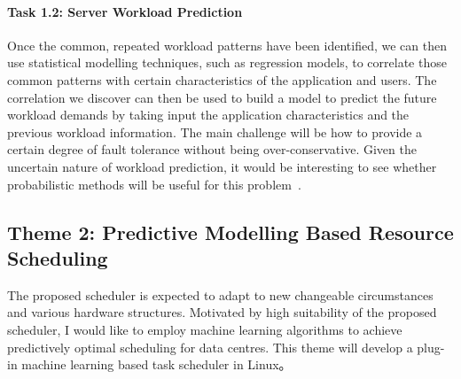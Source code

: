 \paragraph{Task 1.2: Server Workload Prediction} %
Once the common, repeated workload patterns have been identified, we can then use statistical modelling techniques, such as regression models, to correlate those common patterns with certain characteristics of the application and users. The correlation we discover can then be used to build a model to predict the future workload demands by taking input the application characteristics and the previous workload information. The main challenge will be how to provide a certain degree of fault tolerance without being over-conservative. Given the uncertain nature of workload prediction, it would be interesting to see whether probabilistic methods will be useful for this problem~\cite{ma}.

\subsection{Theme 2: Predictive Modelling Based Resource Scheduling}
The proposed scheduler is expected to adapt to new changeable circumstances and various hardware structures. Motivated by high suitability of the proposed scheduler, I would like to employ machine learning algorithms to achieve predictively optimal scheduling for data centres. This theme will develop a plug-in machine learning based task scheduler in Linux。

